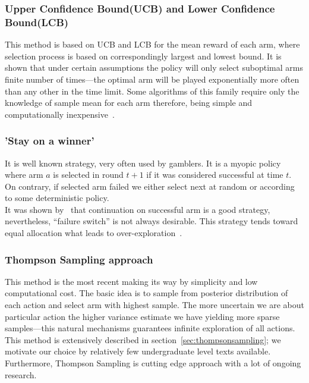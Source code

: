 \documentclass[12pt, a4paper, pdflatex, leqno]{report}
\begin{document}
\subsubsection{Upper Confidence Bound(UCB) and Lower Confidence Bound(LCB)}
This method is based on UCB and LCB for the mean reward of each arm, where selection process is based on correspondingly largest and lowest bound. It is shown that under certain assumptions the policy will only select suboptimal arms finite number of times---the optimal arm will be played exponentially more often than any other in the time limit. Some algorithms of this family require only the knowledge of sample mean for each arm therefore, being simple and computationally inexpensive~\citep{Scott:2010:MBL:1944422.1944432}.\\

\subsubsection{'Stay on a winner'}
It is well known strategy, very often used by gamblers. It is a myopic policy where arm $a$ is selected in round $t+1$ if it was considered successful at time $t$. On contrary, if selected arm failed we either select next at random or according to some deterministic policy.\\
It was shown by~\citep{berry+firstedt} that continuation on successful arm is a good strategy, nevertheless, ``failure switch'' is not always desirable. This strategy tends toward equal allocation what leads to over-exploration~\citep{Scott:2010:MBL:1944422.1944432}.\\


\subsubsection{Thompson Sampling approach}
This method is the most recent making its way by simplicity and low computational cost. The basic idea is to sample from posterior distribution of each action and select arm with highest sample. The more uncertain we are about particular action the higher variance estimate we have yielding more sparse samples---this natural mechanisms guarantees infinite exploration of all actions.\\
This method is extensively described in section~\ref{sec:thompsonsampling}; we motivate our choice by relatively few undergraduate level texts available. Furthermore, Thompson Sampling is cutting edge approach with a lot of ongoing research.\\
\end{document}
